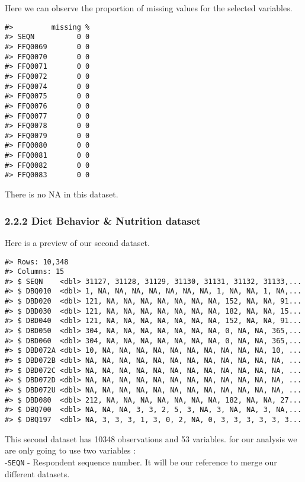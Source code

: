 \documentclass[
]{article}
\begin{document}
Here we can observe the proportion of missing values for the selected
variables.

\begin{verbatim}
#>         missing %
#> SEQN          0 0
#> FFQ0069       0 0
#> FFQ0070       0 0
#> FFQ0071       0 0
#> FFQ0072       0 0
#> FFQ0074       0 0
#> FFQ0075       0 0
#> FFQ0076       0 0
#> FFQ0077       0 0
#> FFQ0078       0 0
#> FFQ0079       0 0
#> FFQ0080       0 0
#> FFQ0081       0 0
#> FFQ0082       0 0
#> FFQ0083       0 0
\end{verbatim}

There is no NA in this dataset.

\hypertarget{diet-behavior-nutrition-dataset}{%
\subsubsection{2.2.2 Diet Behavior \& Nutrition
dataset}\label{diet-behavior-nutrition-dataset}}

Here is a preview of our second dataset.

\begin{verbatim}
#> Rows: 10,348
#> Columns: 15
#> $ SEQN    <dbl> 31127, 31128, 31129, 31130, 31131, 31132, 31133,...
#> $ DBQ010  <dbl> 1, NA, NA, NA, NA, NA, NA, NA, 1, NA, NA, 1, NA,...
#> $ DBD020  <dbl> 121, NA, NA, NA, NA, NA, NA, NA, 152, NA, NA, 91...
#> $ DBD030  <dbl> 121, NA, NA, NA, NA, NA, NA, NA, 182, NA, NA, 15...
#> $ DBD040  <dbl> 121, NA, NA, NA, NA, NA, NA, NA, 152, NA, NA, 91...
#> $ DBD050  <dbl> 304, NA, NA, NA, NA, NA, NA, NA, 0, NA, NA, 365,...
#> $ DBD060  <dbl> 304, NA, NA, NA, NA, NA, NA, NA, 0, NA, NA, 365,...
#> $ DBD072A <dbl> 10, NA, NA, NA, NA, NA, NA, NA, NA, NA, NA, 10, ...
#> $ DBD072B <dbl> NA, NA, NA, NA, NA, NA, NA, NA, NA, NA, NA, NA, ...
#> $ DBD072C <dbl> NA, NA, NA, NA, NA, NA, NA, NA, NA, NA, NA, NA, ...
#> $ DBD072D <dbl> NA, NA, NA, NA, NA, NA, NA, NA, NA, NA, NA, NA, ...
#> $ DBD072U <dbl> NA, NA, NA, NA, NA, NA, NA, NA, NA, NA, NA, NA, ...
#> $ DBD080  <dbl> 212, NA, NA, NA, NA, NA, NA, NA, 182, NA, NA, 27...
#> $ DBQ700  <dbl> NA, NA, NA, 3, 3, 2, 5, 3, NA, 3, NA, NA, 3, NA,...
#> $ DBQ197  <dbl> NA, 3, 3, 3, 1, 3, 0, 2, NA, 0, 3, 3, 3, 3, 3, 3...
\end{verbatim}

This second dataset has 10348 observations and 53 variables. for our
analysis we are only going to use two variables :\\
-\texttt{SEQN} - Respondent sequence number. It will be our reference to
merge our different datasets.
\end{document}
